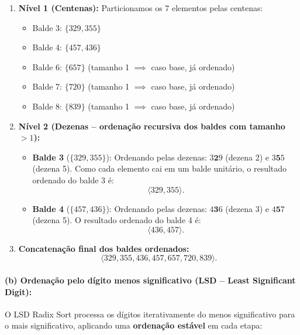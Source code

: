\documentclass[11pt,a4paper]{article}
\begin{document}
\begin{enumerate}
    \item \textbf{Nível 1 (Centenas):}
    Particionamos os 7 elementos pelas centenas:
    \begin{itemize}
        \item Balde 3: $\{329, 355\}$
        \item Balde 4: $\{457, 436\}$
        \item Balde 6: $\{657\}$ \quad (tamanho 1 $\implies$ caso base, já ordenado)
        \item Balde 7: $\{720\}$ \quad (tamanho 1 $\implies$ caso base, já ordenado)
        \item Balde 8: $\{839\}$ \quad (tamanho 1 $\implies$ caso base, já ordenado)
    \end{itemize}

    \item \textbf{Nível 2 (Dezenas -- ordenação recursiva dos baldes com tamanho $> 1$):}
    \begin{itemize}
        \item \textbf{Balde 3} ($\{329, 355\}$):
        Ordenando pelas dezenas:
        $3\mathbf{2}9$ (dezena 2) e $3\mathbf{5}5$ (dezena 5).
        Como cada elemento cai em um balde unitário, o resultado ordenado do balde 3 é:
        \[
            \langle 329, 355 \rangle.
        \]
        \item \textbf{Balde 4} ($\{457, 436\}$):
        Ordenando pelas dezenas:
        $4\mathbf{3}6$ (dezena 3) e $4\mathbf{5}7$ (dezena 5).
        O resultado ordenado do balde 4 é:
        \[
            \langle 436, 457 \rangle.
        \]
    \end{itemize}

    \item \textbf{Concatenação final dos baldes ordenados:}
    \[
        \langle 329, 355, 436, 457, 657, 720, 839 \rangle.
    \]
\end{enumerate}

\paragraph{(b) Ordenação pelo dígito menos significativo (LSD -- Least Significant Digit):}
O LSD Radix Sort processa os dígitos iterativamente do menos significativo para o mais significativo, aplicando uma \textbf{ordenação estável} em cada etapa:
\end{document}
